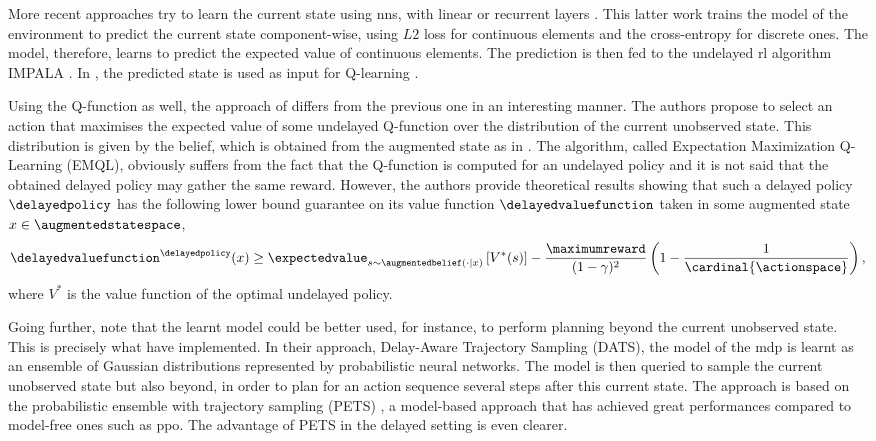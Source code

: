 More recent approaches try to learn the current state using \glspl{nn}, with linear \cite{derman2021acting} or recurrent layers \cite{firoiu2018human}. 
This latter work trains the model of the environment to predict the current state component-wise, using $L2$ loss for continuous elements and the cross-entropy for discrete ones.
The model, therefore, learns to predict the expected value of continuous elements. 
The prediction is then fed to the undelayed \gls{rl} algorithm IMPALA \cite{espeholt2018impala}.
In \cite{derman2021acting}, the predicted state is used as input for Q-learning \cite{watkins1989learning}.  

Using the Q-function as well, the approach of \cite{agarwal2021blind} differs from the previous one in an interesting manner. 
The authors propose to select an action that maximises the expected value of some undelayed Q-function over the distribution of the current unobserved state.
This distribution is given by the belief, which is obtained from the augmented state as in .
The algorithm, called Expectation Maximization Q-Learning (EMQL), obviously suffers from the fact that the Q-function is computed for an undelayed policy and it is not said that the obtained delayed policy may gather the same reward. 
However, the authors provide theoretical results showing that such a delayed policy $\delayedpolicy$ has the following lower bound guarantee on its value function $\delayedvaluefunction$ taken in some augmented state $x\in\augmentedstatespace$,
\begin{align*}
    \delayedvaluefunction^\delayedpolicy(x) \ge \expectedvalue_{s\sim \augmentedbelief(\cdot\vert x)}\left[V^{*}(s)\right] - \frac{\maximumreward}{(1-\gamma)^2}\left(1-\frac{1}{\cardinal{\actionspace}}\right),
\end{align*}
where $V^{*}$ is the value function of the optimal undelayed policy.

Going further, \cite{firoiu2018human} note that the learnt model could be better used, for instance, to perform planning beyond the current unobserved state.
This is precisely what \cite{chen2021delay} have implemented. 
In their approach, Delay-Aware Trajectory Sampling (DATS),
the model of the \gls{mdp} is learnt as an ensemble
of Gaussian distributions represented by probabilistic neural networks. 
The model is then queried to sample the current unobserved state but also beyond, in order to plan for an action sequence several steps after this current state.  
The approach is based on the probabilistic ensemble
with trajectory sampling (PETS) \cite{chua2018deep}, a model-based approach that has achieved great performances compared to model-free ones such as \gls{ppo}. 
The advantage of PETS in the delayed setting is even clearer.


